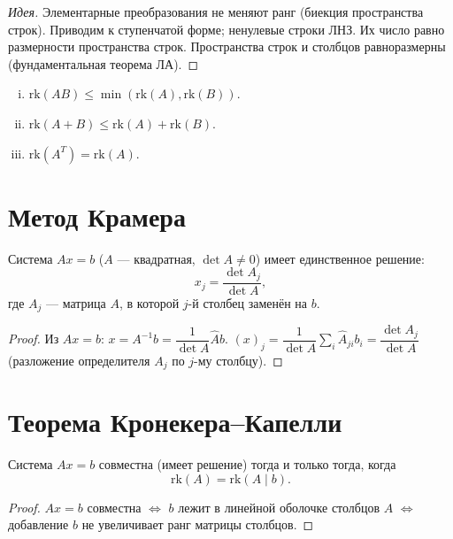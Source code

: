 \documentclass[12pt]{article}
\begin{document}
\begin{proof}[Идея]
Элементарные преобразования не меняют ранг (биекция пространства строк).
Приводим к ступенчатой форме; ненулевые строки ЛНЗ. Их число равно
размерности пространства строк. Пространства строк и столбцов равноразмерны
(фундаментальная теорема ЛА).
\end{proof}

\begin{property}
\begin{enumerate}[(i)]
\item $\mathrm{rk}(AB) \leq \min(\mathrm{rk}(A),\mathrm{rk}(B))$.
\item $\mathrm{rk}(A+B) \leq \mathrm{rk}(A) + \mathrm{rk}(B)$.
\item $\mathrm{rk}(A^T) = \mathrm{rk}(A)$.
\end{enumerate}
\end{property}

\section{Метод Крамера}

\begin{theorem}[Крамер]
Система $Ax = b$ ($A$ --- квадратная, $\det A \neq 0$) имеет
единственное решение:
\[
x_j = \frac{\det A_j}{\det A},
\]
где $A_j$ --- матрица $A$, в которой $j$-й столбец заменён на $b$.
\end{theorem}

\begin{proof}
Из $Ax = b$: $x = A^{-1}b = \dfrac{1}{\det A}\hat{A}b$.
$(x)_j = \dfrac{1}{\det A}\sum_i \hat{A}_{ji} b_i
= \dfrac{\det A_j}{\det A}$
(разложение определителя $A_j$ по $j$-му столбцу).
\end{proof}

\section{Теорема Кронекера--Капелли}

\begin{theorem}
Система $Ax = b$ совместна (имеет решение) тогда и только тогда, когда
\[
\mathrm{rk}(A) = \mathrm{rk}(A \mid b).
\]
\end{theorem}

\begin{proof}
$Ax = b$ совместна $\iff$ $b$ лежит в линейной оболочке столбцов $A$
$\iff$ добавление $b$ не увеличивает ранг матрицы столбцов.
\end{proof}
\end{document}
